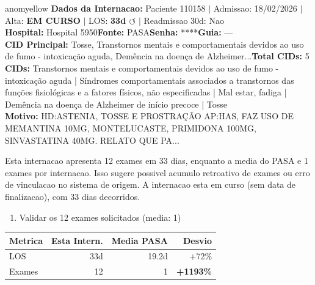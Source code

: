 \documentclass[a4paper,10pt]{article}
\begin{document}
\begin{anomalycard}[Internacao 183487 | PASA | MODERADO (z=2.49)]{anomyellow}
\textbf{Dados da Internacao:} Paciente 110158 $\mid$ Admissao: 18/02/2026 $\mid$ Alta: \textcolor{anomorange}{\textbf{EM CURSO}} $\mid$ LOS: \textbf{33d \textcolor{anomorange}{$\circlearrowleft$}} $\mid$ Readmissao 30d: Nao\\
\textbf{Hospital:} Hospital 5950\quad\textbf{Fonte:} PASA\quad\textbf{Senha:} ****\quad\textbf{Guia:} ---\\
\textbf{CID Principal:} {\small Tosse, Transtornos mentais e comportamentais devidos ao uso de fumo - intoxicação aguda, Demência na doença de Alzheimer...}\quad\textbf{Total CIDs:} 5\\

\textbf{CIDs:} {\scriptsize Transtornos mentais e comportamentais devidos ao uso de fumo - intoxicação aguda | Síndromes comportamentais associados a transtornos das funções fisiológicas e a fatores físicos, não especificadas | Mal estar, fadiga | Demência na doença de Alzheimer de início precoce | Tosse}\\

\textbf{Motivo:} {\scriptsize HD:ASTENIA, TOSSE E PROSTRAÇÃO AP:HAS, FAZ USO DE MEMANTINA 10MG, MONTELUCASTE, PRIMIDONA 100MG, SINVASTATINA 40MG. RELATO QUE PA...}\\

\vspace{2pt}\begin{tcolorbox}[colback=severityred!20,colframe=anomyellow,title={\textbf{Interpretacao de Negocio}},fonttitle=\bfseries\small,left=4pt,right=4pt,top=3pt,bottom=3pt]
{\small Esta internacao apresenta 12 exames em 33 dias, enquanto a media do PASA e 1 exames por internacao. Isso sugere possivel acumulo retroativo de exames ou erro de vinculacao no sistema de origem. A internacao esta em curso (sem data de finalizacao), com 33 dias decorridos.}
\end{tcolorbox}
\begin{tcolorbox}[colback=severityyellow!30,colframe=anomorange,title={\textbf{Recomendacoes Especificas}},fonttitle=\bfseries\small,left=4pt,right=4pt,top=3pt,bottom=3pt]
\begin{enumerate}[nosep,leftmargin=16pt]
\item {\small Validar os 12 exames solicitados (media: 1)}
\end{enumerate}
\end{tcolorbox}
\begin{center}\begin{tabular}{l r r r}\toprule\textbf{Metrica} & \textbf{Esta Intern.} & \textbf{Media PASA} & \textbf{Desvio} \\\midrule
LOS & 33d & 19.2d & \textcolor{anomorange}{+72\%} \\
Exames & 12 & 1 & \textcolor{anomred}{\textbf{+1193\%}} \\
\bottomrule\end{tabular}\end{center}


\end{anomalycard}
\end{document}

